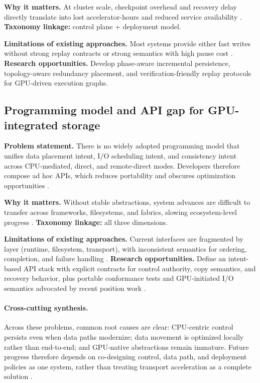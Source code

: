 \textbf{Why it matters.} At cluster scale, checkpoint overhead and recovery delay directly translate into lost accelerator-hours and reduced service availability \cite{zhang2025hpcstoragesurvey,geminifs2025}. \textbf{Taxonomy linkage:} control plane + deployment model.

\textbf{Limitations of existing approaches.} Most systems provide either fast writes without strong replay contracts or strong semantics with high pause cost \cite{hdf5gds2020,rajbhandari2021zeroinfinity}. \textbf{Research opportunities.} Develop phase-aware incremental persistence, topology-aware redundancy placement, and verification-friendly replay protocols for GPU-driven execution graphs.

\subsection{Programming model and API gap for GPU-integrated storage}

\textbf{Problem statement.} There is no widely adopted programming model that unifies data placement intent, I/O scheduling intent, and consistency intent across CPU-mediated, direct, and remote-direct modes. Developers therefore compose ad hoc APIs, which reduces portability and obscures optimization opportunities \cite{silberstein2013gpufs,nvidia_gds_overview,spdk_overview}.

\textbf{Why it matters.} Without stable abstractions, system advances are difficult to transfer across frameworks, filesystems, and fabrics, slowing ecosystem-level progress \cite{traub2023compstoragesurvey,zhang2025hpcstoragesurvey}. \textbf{Taxonomy linkage:} all three dimensions.

\textbf{Limitations of existing approaches.} Current interfaces are fragmented by layer (runtime, filesystem, transport), with inconsistent semantics for ordering, completion, and failure handling \cite{nvidia_gdrdma,nvmeof_spec}. \textbf{Research opportunities.} Define an intent-based API stack with explicit contracts for control authority, copy semantics, and recovery behavior, plus portable conformance tests and GPU-initiated I/O semantics advocated by recent position work \cite{benhaim2025path}.

\paragraph{Cross-cutting synthesis.}
Across these problems, common root causes are clear: CPU-centric control persists even when data paths modernize; data movement is optimized locally rather than end-to-end; and GPU-native abstractions remain immature. Future progress therefore depends on co-designing control, data path, and deployment policies as one system, rather than treating transport acceleration as a complete solution \cite{qureshi2023bam,nvidia_gds_overview,geminifs2025,murray2021tfdata}.
